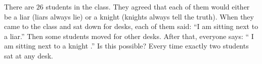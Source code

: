 There are $26$ students in the class.
They agreed that each of them would either be a liar (liars always lie) or a knight (knights always tell the truth).
When they came to the class and sat down for desks, each of them said: “I am sitting next to a liar.”
Then some students moved for other desks. After that, everyone says: “ I am sitting next to a knight .”
Is this possible?
Every time exactly two students sat at any desk.